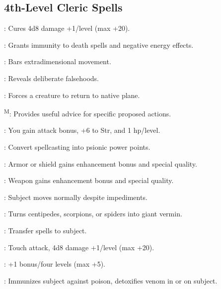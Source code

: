 



\subsection{4th-Level Cleric Spells}



: Cures 4d8 damage +1/level (max +20).

: Grants immunity to death spells and negative energy effects.

: Bars extradimensional movement.

: Reveals deliberate falsehoods.

: Forces a creature to return to native plane.

\textsuperscript{M}: Provides useful advice for specific proposed actions.

: You gain attack bonus, +6 to Str, and 1 hp/level.

: Convert spellcasting into psionic power points.

: Armor or shield gains enhancement bonus and special quality. %

: Weapon gains enhancement bonus and special quality. %

: Subject moves normally despite impediments.

: Turns centipedes, scorpions, or spiders into giant vermin.

: Transfer spells to subject.

: Touch attack, 4d8 damage +1/level (max +20).

: +1 bonus/four levels (max +5).

: Immunizes subject against poison, detoxifies venom in or on subject.

